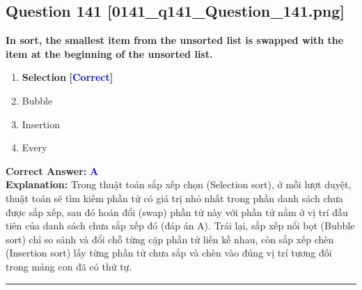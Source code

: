 \documentclass[11pt,a4paper]{article}
\begin{document}
\begin{minipage}{\textwidth}
\subsection*{Question 141 \quad \footnotesize{[0141\_q141\_Question\_141.png]}}
\noindent \textbf{In sort, the smallest item from the unsorted list is swapped with the item at the beginning of the unsorted list.}

\begin{enumerate}[label=\Alph*.]
    \item \textbf{Selection} \hfill \textcolor{blue}{\textbf{[Correct]}}
    \item Bubble
    \item Insertion
    \item Every
\end{enumerate}

\noindent \textbf{Correct Answer:} \textcolor{blue}{\textbf{A}} \\[2pt]
\noindent \textbf{Explanation:} Trong thuật toán sắp xếp chọn (Selection sort), ở mỗi lượt duyệt, thuật toán sẽ tìm kiếm phần tử có giá trị nhỏ nhất trong phần danh sách chưa được sắp xếp, sau đó hoán đổi (swap) phần tử này với phần tử nằm ở vị trí đầu tiên của danh sách chưa sắp xếp đó (đáp án A). Trái lại, sắp xếp nổi bọt (Bubble sort) chỉ so sánh và đổi chỗ từng cặp phần tử liền kề nhau, còn sắp xếp chèn (Insertion sort) lấy từng phần tử chưa sắp và chèn vào đúng vị trí tương đối trong mảng con đã có thứ tự.

\par\vspace{0.3cm}
\hrule
\vspace{0.3cm}
\end{minipage}
\end{document}
